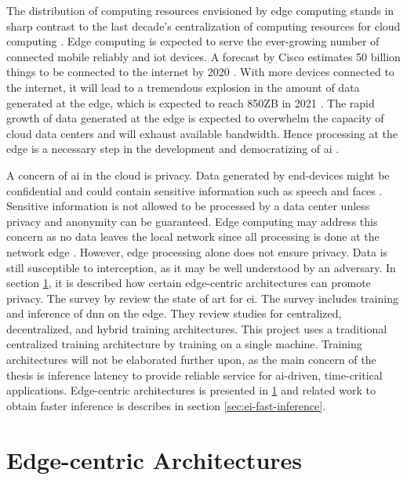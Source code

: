 The distribution of computing resources envisioned by edge computing stands in sharp contrast to the last decade's centralization of computing resources for cloud computing \cite{shi_edge_2016}. Edge computing is expected to serve the ever-growing number of connected mobile reliably and \gls{iot} devices. A forecast by Cisco estimates 50 billion things to be connected to the internet by 2020 \cite{evans_internet_2011}. With more devices connected to the internet, it will lead to a tremendous explosion in the amount of data generated at the edge, which is expected to reach 850ZB in 2021 \cite{cisco_cisco_2018}. The rapid growth of data generated at the edge is expected to overwhelm the capacity of cloud data centers and will exhaust available bandwidth. Hence processing at the edge is a necessary step in the development and democratizing of \gls{ai} \cite{zhou_edge_2019}.

A concern of \gls{ai} in the cloud is privacy. Data generated by end-devices might be confidential and could contain sensitive information such as speech and faces \cite{chen_deep_2019}. Sensitive information is not allowed to be processed by a data center unless privacy and anonymity can be guaranteed. Edge computing may address this concern as no data leaves the local network since all processing is done at the network edge \cite{chen_deep_2019}. However, edge processing alone does not ensure privacy. Data is still susceptible to interception, as it may be well understood by an adversary. In section \ref{sec:ei-architecture}, it is described how certain edge-centric architectures can promote privacy. 
The survey  by \citet{zhou_edge_2019} review the state of art for \gls{ei}. The survey includes training and inference of \gls{dnn} on the edge. They review studies for centralized, decentralized, and hybrid training architectures. This project uses a traditional centralized training architecture by training on a single machine. Training architectures will not be elaborated further upon, as the main concern of the thesis is inference latency to provide reliable service for \gls{ai}-driven, time-critical applications. Edge-centric architectures is presented in \ref{sec:ei-architecture} and related work to obtain faster inference is describes in section \ref{sec:ei-fast-inference}. 

\newpage
\section{Edge-centric Architectures} \label{sec:ei-architecture}

